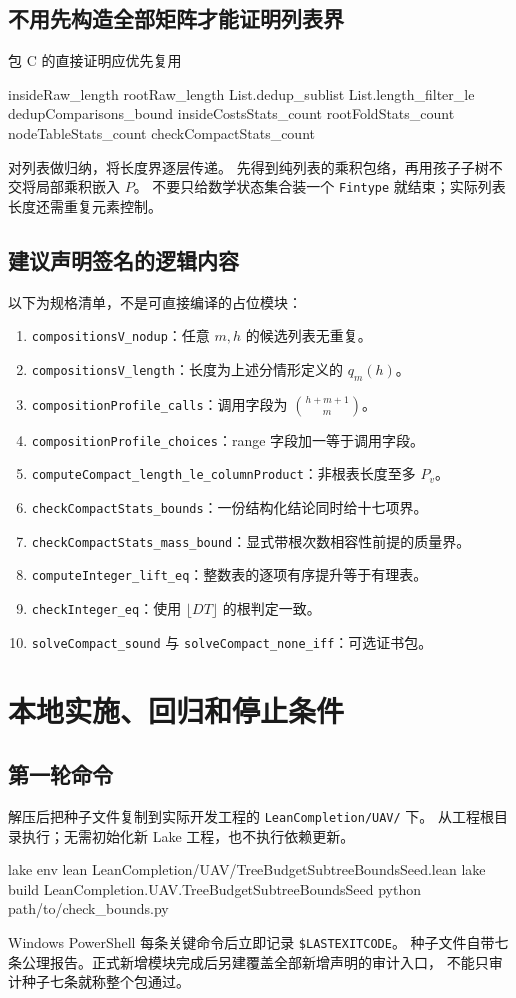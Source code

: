 \documentclass[UTF8,a4paper,11pt]{ctexart}
\theoremstyle{definition}
\begin{document}
\subsection{不用先构造全部矩阵才能证明列表界}
包 C 的直接证明应优先复用
\begin{Code}
insideRaw_length
rootRaw_length
List.dedup_sublist
List.length_filter_le
dedupComparisons_bound
insideCostsStats_count
rootFoldStats_count
nodeTableStats_count
checkCompactStats_count
\end{Code}
对列表做归纳，将长度界逐层传递。
先得到纯列表的乘积包络，再用孩子子树不交将局部乘积嵌入 $P$。
不要只给数学状态集合装一个 \texttt{Fintype} 就结束；实际列表长度还需重复元素控制。

\subsection{建议声明签名的逻辑内容}
以下为规格清单，不是可直接编译的占位模块：
\begin{enumerate}
\item \texttt{compositionsV\_nodup}：任意 $m,h$ 的候选列表无重复。
\item \texttt{compositionsV\_length}：长度为上述分情形定义的 $q_m(h)$。
\item \texttt{compositionProfile\_calls}：调用字段为 $\binom{h+m+1}{m}$。
\item \texttt{compositionProfile\_choices}：range 字段加一等于调用字段。
\item \texttt{computeCompact\_length\_le\_columnProduct}：非根表长度至多 $P_v$。
\item \texttt{checkCompactStats\_bounds}：一份结构化结论同时给十七项界。
\item \texttt{checkCompactStats\_mass\_bound}：显式带根次数相容性前提的质量界。
\item \texttt{computeInteger\_lift\_eq}：整数表的逐项有序提升等于有理表。
\item \texttt{checkInteger\_eq}：使用 $\lfloor DT\rfloor$ 的根判定一致。
\item \texttt{solveCompact\_sound} 与 \texttt{solveCompact\_none\_iff}：可选证书包。
\end{enumerate}

\section{本地实施、回归和停止条件}

\subsection{第一轮命令}
解压后把种子文件复制到实际开发工程的 \texttt{LeanCompletion/UAV/} 下。
从工程根目录执行；无需初始化新 Lake 工程，也不执行依赖更新。
\begin{Code}
lake env lean LeanCompletion/UAV/TreeBudgetSubtreeBoundsSeed.lean
lake build LeanCompletion.UAV.TreeBudgetSubtreeBoundsSeed
python path/to/check_bounds.py
\end{Code}
Windows PowerShell 每条关键命令后立即记录 \texttt{\$LASTEXITCODE}。
种子文件自带七条公理报告。正式新增模块完成后另建覆盖全部新增声明的审计入口，
不能只审计种子七条就称整个包通过。
\end{document}
